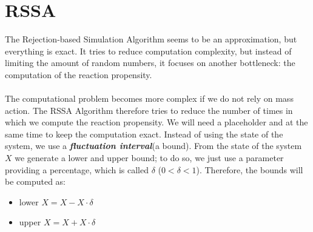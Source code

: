 \section{RSSA}
The Rejection-based Simulation Algorithm seems to be an approximation, but everything is exact.
It tries to reduce computation complexity, but instead of limiting the amount of random numbers, it focuses on another bottleneck: the computation of the reaction propensity.
\\
\\
\noindent
The computational problem becomes more complex if we do not rely on mass action.
The RSSA Algorithm therefore tries to reduce the number of times in which we compute the reaction propensity.
We will need a placeholder and at the same time to keep the computation exact.
Instead of using the state of the system, we use a \textbf{\emph{fluctuation interval}}(a bound).
From the state of the system $X$ we generate a lower and upper bound; to do so, we just use a parameter providing a percentage, which is called $\delta$ ($0<\delta<1$).
Therefore, the bounds will be computed as:

\begin{itemize}
  \item lower $X = X - X \cdot \delta$ \item upper $X = X + X \cdot \delta$
\end{itemize}

